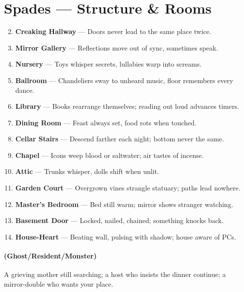\documentclass[11pt]{article}
\begin{document}
\section*{Spades --- Structure \& Rooms}
\label{sec:haunted-house-rooms}
\begin{enumerate}
\setcounter{enumi}{1}
\item \textbf{Creaking Hallway} --- Doors never lead to the same place twice.
\item \textbf{Mirror Gallery} --- Reflections move out of sync, sometimes speak.
\item \textbf{Nursery} --- Toys whisper secrets, lullabies warp into screams.
\item \textbf{Ballroom} --- Chandeliers sway to unheard music, floor remembers every dance.
\item \textbf{Library} --- Books rearrange themselves; reading out loud advances timers.
\item \textbf{Dining Room} --- Feast always set, food rots when touched.
\item \textbf{Cellar Stairs} --- Descend farther each night; bottom never the same.
\item \textbf{Chapel} --- Icons weep blood or saltwater; air tastes of incense.
\item \textbf{Attic} --- Trunks whisper, dolls shift when unlit.
\item[J] \textbf{Garden Court} --- Overgrown vines strangle statuary; paths lead nowhere.
\item[Q] \textbf{Master's Bedroom} --- Bed still warm; mirror shows stranger watching.
\item[K] \textbf{Basement Door} --- Locked, nailed, chained; something knocks back.
\item[A] \textbf{House-Heart} --- Beating wall, pulsing with shadow; house aware of PCs.
\end{enumerate}

\paragraph*{(Ghost/Resident/Monster)} A grieving mother still searching; a host who insists the dinner continue; a mirror-double who wants your place.
\end{document}
